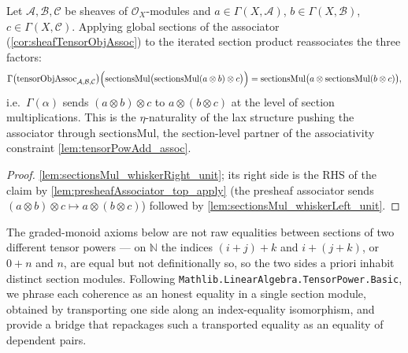 \begin{lemma}\leanok
  \label{lem:tensorObjAssoc_hom_sectionsMul}
  Let \(\mathcal{A}, \mathcal{B}, \mathcal{C}\) be sheaves of
  \(\mathcal{O}_X\)-modules and \(a \in \Gamma(X,\mathcal{A})\),
  \(b \in \Gamma(X,\mathcal{B})\), \(c \in \Gamma(X,\mathcal{C})\). Applying global
  sections of the associator (\cref{cor:sheafTensorObjAssoc}) to the iterated
  section product reassociates the three factors:
  \[
    \Gamma\bigl(\mathrm{tensorObjAssoc}_{\mathcal{A},\mathcal{B},\mathcal{C}}\bigr)
      \Bigl(\mathrm{sectionsMul}\bigl(
        \mathrm{sectionsMul}(a \otimes b) \otimes c\bigr)\Bigr)
      = \mathrm{sectionsMul}\bigl(a \otimes \mathrm{sectionsMul}(b \otimes c)\bigr),
  \]
  i.e.\ \(\Gamma(\alpha)\) sends \((a \otimes b) \otimes c\) to
  \(a \otimes (b \otimes c)\) at the level of section multiplications. This is the
  \(\eta\)-naturality of the lax structure pushing the associator through
  \(\mathrm{sectionsMul}\), the section-level partner of the associativity
  constraint \cref{lem:tensorPowAdd_assoc}.
\end{lemma}

\begin{proof}
  \leanok
  \cref{lem:sectionsMul_whiskerRight_unit}; its right side is the RHS of the claim
  by \cref{lem:presheafAssociator_top_apply} (the presheaf associator sends
  \((a \otimes b) \otimes c \mapsto a \otimes (b \otimes c)\)) followed by
  \cref{lem:sectionsMul_whiskerLeft_unit}.
\end{proof}

The graded-monoid axioms below are not raw equalities between sections of two
different tensor powers --- on \(\mathbb{N}\) the indices \((i+j)+k\) and
\(i+(j+k)\), or \(0+n\) and \(n\), are equal but not definitionally so, so the two
sides a priori inhabit distinct section modules. Following
\texttt{Mathlib.LinearAlgebra.TensorPower.Basic}, we phrase each coherence as an
honest equality in a single section module, obtained by transporting one side
along an index-equality isomorphism, and provide a bridge that repackages such a
transported equality as an equality of dependent pairs.

